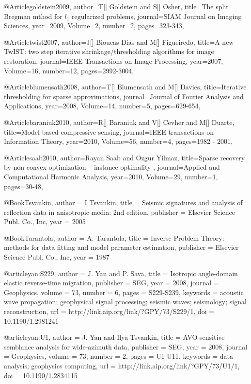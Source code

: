 {@Article{goldstein2009,
  author={T[] Goldstein and S[] Osher},
  title={The split Bregman mthod for $l_1$ regularized problems},
  journal={SIAM Journal on Imaging Sciences},
  year=2009,
  Volume=2,
  number=2,
  pages={323-343},
}



@Article{twist2007,
  author={J[] Bioucas-Dias and M[] Figueiredo},
  title={A new TwIST: two step iterative shrinkage/thresholding algorithms for image restoration},
  journal={IEEE Transactions on Image Processing},
  year=2007,
  Volume=16,
  number=12,
  pages={2992-3004},
}

@Article{blumensath2008,
  author={T[] Blumensath and M[] Davies},
  title={Iterative thresholding for sparse approximations},
  journal={Journal of Fourier Analysis and Applications},
  year=2008,
  Volume=14,
  number=5,
  pages={629-654},
}

@Article{baraniuk2010,
  author={R[] Baraniuk and V[] Cevher and M[] Duarte},
  title={Model-based compressive sensing},
  journal={IEEE transactions on Information Theory},
  year=2010,
  Volume=56,
  number=4,
  pages={1982 - 2001},
}

@Article{saab2010,
  author={Rayan Saab and Ozgur Yilmaz},
  title={Sparse recovery by non-convex optimization – instance optimality },
  journal={Applied and Computational Harmonic Analysis},
  year=2010,
  Volume=29,
  number=1,
  pages={30-48},
}

@Book{Tsvankin,
  author =	 {I Tsvankin},
  title =	 {Seismic signatures and analysis of reflection data
                  in anisotropic media: 2nd edition},
  publisher =	 {Elsevier Science Publ. Co., Inc},
  year =	 2005
}

@Book{Tarantola,
  author = 	 {A. Tarantola},
  title = 	 {Inverse {P}roblem {T}heory: methods for data
                 fitting and model parameter estimation},
  publisher = 	 {Elsevier Science Publ. Co., Inc},
  year = 	 1987
}

@article{yan:S229,
  author =	 {J. Yan and P. Sava},
  title =	 {Isotropic angle-domain elastic reverse-time
                  migration},
  publisher =	 {SEG},
  year =	 2008,
  journal =	 {Geophysics},
  volume =	 73,
  number =	 6,
  pages =	 {S229-S239},
  keywords =	 {acoustic wave propagation; geophysical signal
                  processing; seismic waves; seismology; signal
                  reconstruction},
  url =		 {http://link.aip.org/link/?GPY/73/S229/1},
  doi =		 {10.1190/1.2981241}
}

@article{yan:U1,
  author =	 {J. Yan and Ilya Tsvankin},
  title =	 {AVO-sensitive semblance analysis for wide-azimuth
                  data},
  publisher =	 {SEG},
  year =	 2008,
  journal =	 {Geophysics},
  volume =	 73,
  number =	 2,
  pages =	 {U1-U11},
  keywords =	 {data analysis; geophysics computing},
  url =		 {http://link.aip.org/link/?GPY/73/U1/1},
  doi =		 {10.1190/1.2834115}
}

}
